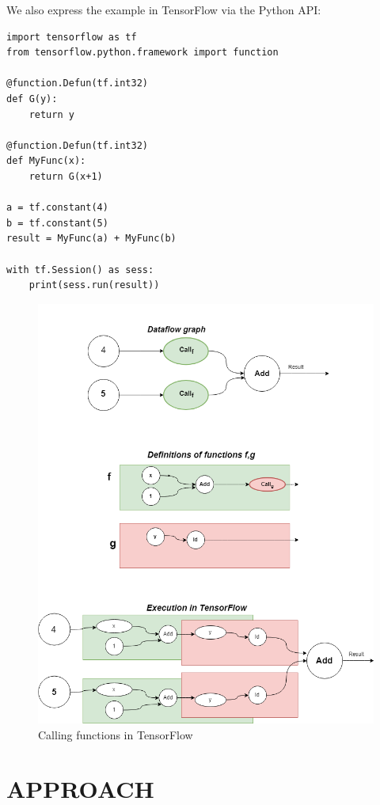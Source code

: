 \documentclass[ack,preface]{dithesis}
\begin{document}
We also express the example in TensorFlow via the Python API:
\begin{lstlisting}
import tensorflow as tf
from tensorflow.python.framework import function

@function.Defun(tf.int32)
def G(y):
	return y

@function.Defun(tf.int32)
def MyFunc(x):
	return G(x+1)

a = tf.constant(4)
b = tf.constant(5)
result = MyFunc(a) + MyFunc(b)

with tf.Session() as sess:
	print(sess.run(result))
\end{lstlisting}

\begin{figure}
\centering
\includegraphics[scale=0.6]{figures/Tf_recursion}
\caption{ Calling functions in TensorFlow}
\end{figure}


\chapter{APPROACH}
\end{document}
